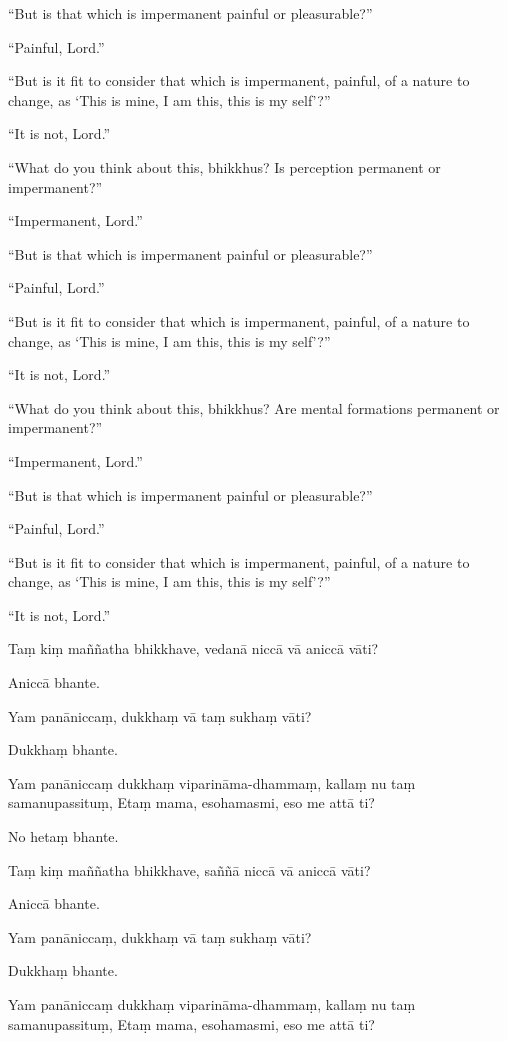 ``But is that which is impermanent painful or pleasurable?''

``Painful, Lord.''

``But is it fit to consider that which is impermanent, painful, of a
nature to change, as `This is mine, I am this, this is my self'?''

``It is not, Lord.''

``What do you think about this, bhikkhus? Is perception permanent or
impermanent?''

``Impermanent, Lord.''

``But is that which is impermanent painful or pleasurable?''

``Painful, Lord.''

``But is it fit to consider that which is impermanent, painful, of a
nature to change, as `This is mine, I am this, this is my self'?''

``It is not, Lord.''

``What do you think about this, bhikkhus? Are mental formations
permanent or impermanent?''

``Impermanent, Lord.''

``But is that which is impermanent painful or pleasurable?''

``Painful, Lord.''

``But is it fit to consider that which is impermanent, painful, of a
nature to change, as `This is mine, I am this, this is my self'?''

``It is not, Lord.''

\clearpage

\paliText

Taṃ kiṃ maññatha bhikkhave, vedanā niccā vā aniccā vāti?

Aniccā bhante.

Yam panāniccaṃ, dukkhaṃ vā taṃ sukhaṃ vāti?

Dukkhaṃ bhante.

Yam panāniccaṃ dukkhaṃ viparināma-dhammaṃ, kallaṃ nu taṃ samanupassituṃ,
Etaṃ mama, esohamasmi, eso me attā ti?

No hetaṃ bhante.

Taṃ kiṃ maññatha bhikkhave, saññā niccā vā aniccā vāti?

Aniccā bhante.

Yam panāniccaṃ, dukkhaṃ vā taṃ sukhaṃ vāti?

Dukkhaṃ bhante.

Yam panāniccaṃ dukkhaṃ viparināma-dhammaṃ, kallaṃ nu taṃ samanupassituṃ,
Etaṃ mama, esohamasmi, eso me attā ti?

